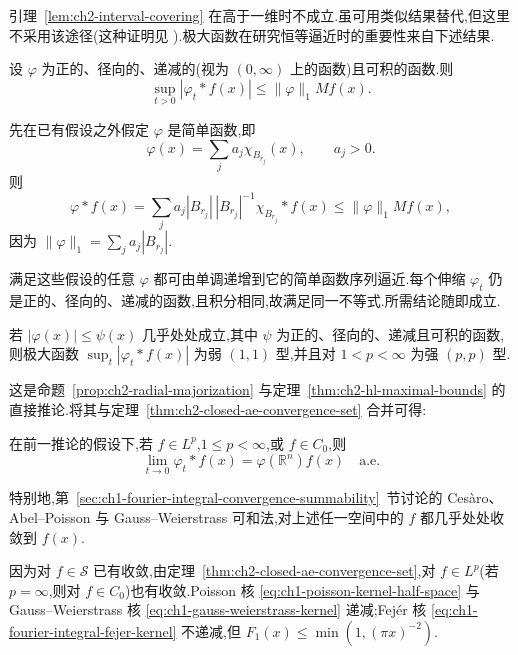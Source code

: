 引理~\ref{lem:ch2-interval-covering} 在高于一维时不成立.虽可用类似结果替代,但这里不采用该途径(这种证明见 ).极大函数在研究恒等逼近时的重要性来自下述结果.

\begin{Proposition}
\label{prop:ch2-radial-majorization}
设 $\varphi$ 为正的、径向的、递减的(视为 $(0,\infty)$ 上的函数)且可积的函数.则
\[
 \sup_{t>0}|\varphi_t*f(x)|\le\|\varphi\|_1Mf(x).
\]
\end{Proposition}

\hypertarget{sample-page-044}{}
\begin{Proof}
先在已有假设之外假定 $\varphi$ 是简单函数,即
\[
 \varphi(x)=\sum_ja_j\chi_{B_{r_j}}(x),\qquad a_j>0.
\]
则
\[
 \varphi*f(x)=\sum_ja_j|B_{r_j}|\,|B_{r_j}|^{-1}\chi_{B_{r_j}}*f(x)
 \le\|\varphi\|_1Mf(x),
\]
因为 $\|\varphi\|_1=\sum_ja_j|B_{r_j}|$.

满足这些假设的任意 $\varphi$ 都可由单调递增到它的简单函数序列逼近.每个伸缩 $\varphi_t$ 仍是正的、径向的、递减的函数,且积分相同,故满足同一不等式.所需结论随即成立.
\end{Proof}

\begin{Corollary}
\label{cor:ch2-kernel-maximal-bound}
若 $|\varphi(x)|\le\psi(x)$ 几乎处处成立,其中 $\psi$ 为正的、径向的、递减且可积的函数,则极大函数 $\sup_t|\varphi_t*f(x)|$ 为弱 $(1,1)$ 型,并且对 $1<p<\infty$ 为强 $(p,p)$ 型.
\end{Corollary}

这是命题~\ref{prop:ch2-radial-majorization} 与定理~\ref{thm:ch2-hl-maximal-bounds} 的直接推论.将其与定理~\ref{thm:ch2-closed-ae-convergence-set} 合并可得:

\begin{Corollary}
\label{cor:ch2-approximation-ae-convergence}
在前一推论的假设下,若 $f\in L^p$,$1\le p<\infty$,或 $f\in C_0$,则
\[
 \lim_{t\to0}\varphi_t*f(x)=\varphi(\mathbb R^n)f(x)\quad\text{a.e.}
\]
\end{Corollary}
特别地,第~\ref{sec:ch1-fourier-integral-convergence-summability}~节讨论的 Cesàro、Abel--Poisson 与 Gauss--Weierstrass 可和法,对上述任一空间中的 $f$ 都几乎处处收敛到 $f(x)$.

\begin{Proof}
因为对 $f\in\mathcal S$ 已有收敛,由定理~\ref{thm:ch2-closed-ae-convergence-set},对 $f\in L^p$(若 $p=\infty$,则对 $f\in C_0$)也有收敛.Poisson 核 \eqref{eq:ch1-poisson-kernel-half-space} 与 Gauss--Weierstrass 核 \eqref{eq:ch1-gauss-weierstrass-kernel} 递减;Fejér 核 \eqref{eq:ch1-fourier-integral-fejer-kernel} 不递减,但 $F_1(x)\le\min(1,(\pi x)^{-2})$.
\end{Proof}

